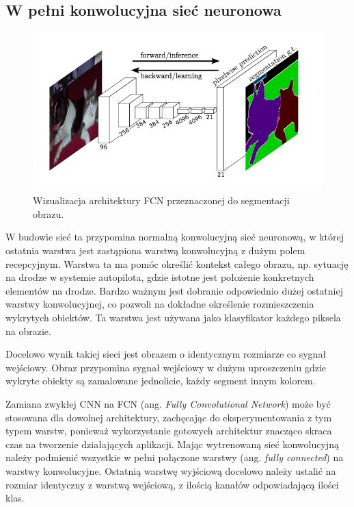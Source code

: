 \documentclass[12pt,a4paper,twoside,titlepage,openright]{book}
\begin{document}
\begin{itemize}
\begin{itemize}
\subsection{W pełni konwolucyjna sieć neuronowa}

\begin{figure}[ht]
	\centering
			\includegraphics[resolution=100, scale=0.8]{fullyConvolutionalNetwork.png}
		\caption{Wizualizacja architektury FCN przeznaczonej do segmentacji obrazu.}
\end{figure}
W budowie sieć ta przypomina normalną konwolucyjną sieć neuronową, w której ostatnia warstwa jest zastąpiona warstwą konwolucyjną z dużym polem recepcyjnym. Warstwa ta ma pomóc określić kontekst całego obrazu, np. sytuację na drodze w systemie autopilota, gdzie istotne jest położenie konkretnych elementów na drodze. Bardzo ważnym jest dobranie odpowiednio dużej ostatniej warstwy konwolucyjnej, co pozwoli na dokładne określenie rozmieszczenia wykrytych obiektów. Ta warstwa jest używana jako klasyfikator każdego piksela na obrazie.

Docelowo wynik takiej sieci jest obrazem o identycznym rozmiarze co sygnał wejściowy. Obraz przypomina sygnał wejściowy w dużym uproszczeniu gdzie wykryte obiekty są zamalowane jednolicie, każdy segment innym kolorem.

Zamiana zwykłej CNN na FCN (ang. \textit{Fully Convolutional Network}) może być stosowana dla dowolnej architektury, zachęcając do eksperymentowania z tym typem warstw, ponieważ wykorzystanie gotowych architektur znacząco skraca czas na tworzenie działających aplikacji. Mając wytrenowaną sieć konwolucyjną należy podmienić wszystkie w pełni połączone warstwy (ang. \textit{fully connected}) na warstwy konwolucyjne. Ostatnią warstwę wyjściową docelowo należy ustalić na rozmiar identyczny z warstwą wejściową, z ilością kanałów odpowiadającą ilości klas.


\end{itemize}
\end{itemize}
\end{document}
